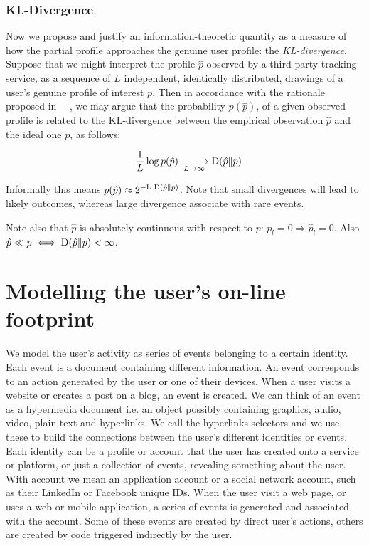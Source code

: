 \subsubsection{KL-Divergence}

Now we propose and justify an information-theoretic quantity as a measure of how the partial profile approaches the genuine user profile: the \emph{KL-divergence}. Suppose that we might interpret the profile $\hat{p}$ observed by a third-party tracking service, as a sequence of $L$ independent, identically distributed, drawings of a user's genuine profile of interest $p$. Then in accordance with the rationale proposed in ~\cite{Parra14FGCS}~\cite{Rebollo11SecTech}, we may argue that the probability $p(\hat{p})$, of a given observed profile is related to the KL-divergence between the empirical observation $\hat{p}$ and the ideal one $p$, as follows:

$$ - \frac {1}{L} \log{p(\hat{p})} \xrightarrow[L \to \infty]{} \textnormal{D}(\hat{p} \| p) $$

Informally this means $p(\hat{p}) \approx 2^{-\textnormal{L D}(\hat{p} \| p) } $. Note that small divergences will lead to likely outcomes, whereas large divergence associate with rare events.

Note also that $\hat{p}$ is absolutely continuous with respect to $p$: $p_l = 0 \Rightarrow \hat{p}_l = 0$. Also $\hat{p} \ll p \iff  \textnormal{D}(\hat{p} \| p) < \infty$.

\section{Modelling the user's on-line footprint}
\noindent
We model the user's activity as series of events belonging to a certain identity. Each event is a document containing different information. An event corresponds to an action generated by the user or one of their devices. When a user visits a website or creates a post on a blog, an event is created. We can think of an event as a hypermedia document i.e. an object possibly containing graphics, audio, video, plain text and hyperlinks. We call the hyperlinks selectors and we use these to build the connections between the user's different identities or events. Each identity can be a profile or account that the user has created onto a service or platform, or just a collection of events, revealing something about the user. With account we mean an application account or a social network account, such as their LinkedIn or Facebook unique IDs. When the user visit a web page, or uses a web or mobile application, a series of events is generated and associated with the account. Some of these events are created by direct user's actions, others are created by code triggered indirectly by the user.

